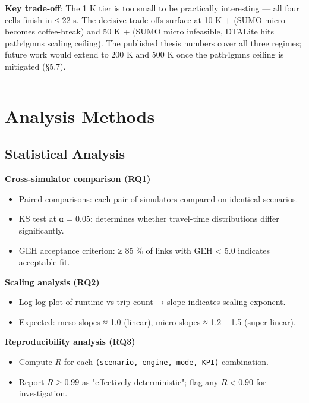 \textbf{Key trade-off}: The 1 K tier is too small to be practically
interesting --- all four cells finish in ≤ 22 s. The decisive trade-offs
surface at 10 K + (SUMO micro becomes coffee-break) and 50 K + (SUMO
micro infeasible, DTALite hits path4gmns scaling ceiling). The published
thesis numbers cover all three regimes; future work would extend to 200
K and 500 K once the path4gmns ceiling is mitigated (§5.7).

\begin{center}\rule{0.5\linewidth}{0.5pt}\end{center}

\section{Analysis Methods}\label{45-analysis-methods}

\subsection{Statistical Analysis}\label{451-statistical-analysis}

\textbf{Cross-simulator comparison (RQ1)}

\begin{itemize}
\tightlist
\item
  Paired comparisons: each pair of simulators compared on identical
  scenarios.
\item
  KS test at α = 0.05: determines whether travel-time distributions
  differ significantly.
\item
  GEH acceptance criterion: ≥ 85 \% of links with GEH \textless{} 5.0
  indicates acceptable fit.
\end{itemize}

\textbf{Scaling analysis (RQ2)}

\begin{itemize}
\tightlist
\item
  Log-log plot of runtime vs trip count → slope indicates scaling
  exponent.
\item
  Expected: meso slopes ≈ 1.0 (linear), micro slopes ≈ 1.2 -- 1.5
  (super-linear).
\end{itemize}

\textbf{Reproducibility analysis (RQ3)}

\begin{itemize}
\tightlist
\item
  Compute \(R\) for each \texttt{(scenario,\ engine,\ mode,\ KPI)}
  combination.
\item
  Report \(R \geq 0.99\) as "effectively deterministic"; flag any
  \(R < 0.90\) for investigation.
\end{itemize}

